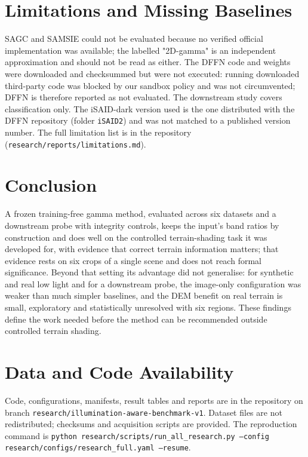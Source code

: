 \documentclass[conference]{IEEEtran}
\begin{document}
\section{Limitations and Missing Baselines}
SAGC \cite{huang2018sagc} and SAMSIE \cite{huang2022samsie} could not be evaluated because no verified official implementation was available; the labelled "2D-gamma" is an independent approximation and should not be read as either. The DFFN \cite{yao2024dffn} code and weights were downloaded and checksummed but were not executed: running downloaded third-party code was blocked by our sandbox policy and was not circumvented; DFFN is therefore reported as not evaluated. The downstream study covers classification only. The iSAID-dark version used is the one distributed with the DFFN repository (folder \texttt{iSAID2}) and was not matched to a published version number. The full limitation list is in the repository (\texttt{research/reports/limitations.md}).

\section{Conclusion}
A frozen training-free gamma method, evaluated across six datasets and a downstream probe with integrity controls, keeps the input's band ratios by construction and does well on the controlled terrain-shading task it was developed for, with evidence that correct terrain information matters; that evidence rests on six crops of a single scene and does not reach formal significance. Beyond that setting its advantage did not generalise: for synthetic and real low light and for a downstream probe, the image-only configuration was weaker than much simpler baselines, and the DEM benefit on real terrain is small, exploratory and statistically unresolved with six regions. These findings define the work needed before the method can be recommended outside controlled terrain shading.

\section*{Data and Code Availability}
Code, configurations, manifests, result tables and reports are in the repository on branch \texttt{research/illumination-aware-benchmark-v1}. Dataset files are not redistributed; checksums and acquisition scripts are provided. The reproduction command is \texttt{python research/scripts/run\_all\_research.py --config research/configs/research\_full.yaml --resume}.



\end{document}

